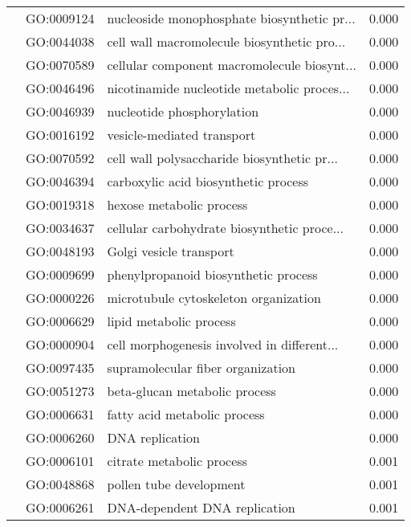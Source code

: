 \begin{longtable}{lllr}
   & GO:0009124 &  nucleoside monophosphate biosynthetic pr... &         0.000 \\
   & GO:0044038 &  cell wall macromolecule biosynthetic pro... &         0.000 \\
   & GO:0070589 &  cellular component macromolecule biosynt... &         0.000 \\
   & GO:0046496 &  nicotinamide nucleotide metabolic proces... &         0.000 \\
   & GO:0046939 &                   nucleotide phosphorylation &         0.000 \\
   & GO:0016192 &                   vesicle-mediated transport &         0.000 \\
   & GO:0070592 &  cell wall polysaccharide biosynthetic pr... &         0.000 \\
   & GO:0046394 &         carboxylic acid biosynthetic process &         0.000 \\
   & GO:0019318 &                     hexose metabolic process &         0.000 \\
   & GO:0034637 &  cellular carbohydrate biosynthetic proce... &         0.000 \\
   & GO:0048193 &                      Golgi vesicle transport &         0.000 \\
   & GO:0009699 &         phenylpropanoid biosynthetic process &         0.000 \\
   & GO:0000226 &        microtubule cytoskeleton organization &         0.000 \\
   & GO:0006629 &                      lipid metabolic process &         0.000 \\
   & GO:0000904 &  cell morphogenesis involved in different... &         0.000 \\
   & GO:0097435 &            supramolecular fiber organization &         0.000 \\
   & GO:0051273 &                beta-glucan metabolic process &         0.000 \\
   & GO:0006631 &                 fatty acid metabolic process &         0.000 \\
   & GO:0006260 &                              DNA replication &         0.000 \\
   & GO:0006101 &                    citrate metabolic process &         0.001 \\
   & GO:0048868 &                      pollen tube development &         0.001 \\
   & GO:0006261 &                DNA-dependent DNA replication &         0.001 \\

\end{longtable}
